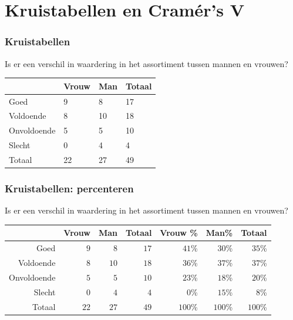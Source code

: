 \documentclass{beamer}
\begin{document}
\begin{frame}
\begin{columns}
\begin{column}{0.3\textwidth}
    \end{column}
  \end{columns}
\end{frame}

\section{Kruistabellen en Cramér's V}
\sectionframelogo{}

\begin{frame}
  \frametitle{Kruistabellen}
  Is er een verschil in waardering in het assortiment tussen mannen en vrouwen?

  \begin{table}[h]
    \begin{tabular}{l||l|l||l}
      & Vrouw & Man & Totaal \\ \hline \hline
      Goed        & 9     & 8   & 17     \\
      Voldoende   & 8     & 10  & 18     \\
      Onvoldoende & 5     & 5   & 10     \\
      Slecht      & 0     & 4   & 4      \\ \hline \hline
      Totaal      & 22    & 27  & 49     \\
    \end{tabular}
  \end{table}
\end{frame}

\begin{frame}
  \frametitle{Kruistabellen: percenteren}
  Is er een verschil in waardering in het assortiment tussen mannen en vrouwen?
  \begin{adjustwidth}{-1.5em}{-1.5em}
    \begin{table}[h] \centering
      \begin{tabular}{@{}rrrrrrr@{}} \toprule
        & Vrouw & Man & Totaal & Vrouw \% & Man\%   & Totaal  \\ \midrule
        Goed        & $9$     & $8$  & $17$     & $41$\%  & $30$\%  & $35$\% \\
        Voldoende   & $8$     & $10$ & $18$     & $36$\%  & $37$\%  & $37$\% \\
        Onvoldoende & $5$     & $5$  & $10$     & $23$\%  & $18$\%  & $20$\% \\
        Slecht      & $0$     & $4$  & $4$      & $0$\%   & $15$\%  & $8$\%  \\
        Totaal      & $22$    & $27$ & $49$     & $100$\% & $100$\% & $100$\%\\
        \bottomrule
      \end{tabular}
    \end{table}
  \end{adjustwidth}
\end{frame}
\end{document}
